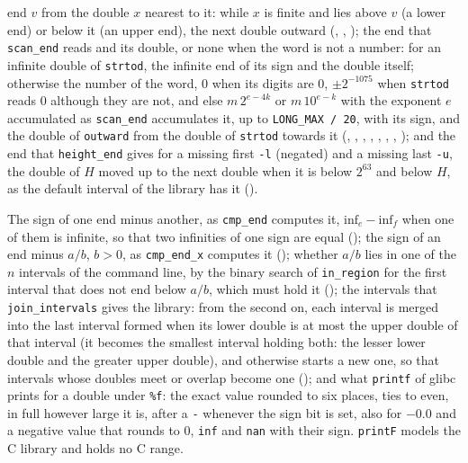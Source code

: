 \begin{definition}
  end $v$ from the double $x$ nearest to it: while $x$ is finite and lies above $v$ (a lower end) or
  below it (an upper end), the next double outward (,
  , ); the end that \verb|scan_end| reads and
  its double, or none when the word is not a number: for an infinite double of \verb|strtod|, the
  infinite end of its sign and the double itself; otherwise the number of the word, $0$ when its
  digits are $0$, $\pm 2^{-1075}$ when \verb|strtod| reads $0$ although they are not, and else
  $m\,2^{e - 4k}$ or $m\,10^{e - k}$ with the exponent $e$ accumulated as \verb|scan_end|
  accumulates it, up to \verb|LONG_MAX / 20|, with its sign, and the double of \verb|outward| from
  the double of \verb|strtod| towards it (, ,
  , , ,
  , , ); and the end
  that \verb|height_end| gives for a missing first \verb|-l| (negated) and a missing last \verb|-u|,
  the double of $H$ moved up to the next double when it is below $2^{63}$ and below $H$, as the
  default interval of the library has it ().
\end{definition}

\begin{definition}\label{def:cliRegionTest}
  \leanok
  The sign of one end minus another, as \verb|cmp_end| computes it,
  $\mathrm{inf}_e - \mathrm{inf}_f$ when one of them is infinite, so that two infinities of one sign
  are equal (); the sign of an end minus $a/b$, $b > 0$, as
  \verb|cmp_end_x| computes it (); whether $a/b$ lies in one of the $n$
  intervals of the command line, by the binary search of \verb|in_region| for the first interval
  that does not end below $a/b$, which must hold it (); the intervals that
  \verb|join_intervals| gives the library: from the second on, each interval is merged into the last
  interval formed when its lower double is at most the upper double of that interval (it becomes the
  smallest interval holding both: the lesser lower double and the greater upper double), and
  otherwise starts a new one, so that intervals whose doubles meet or overlap become one
  (); and what \verb|printf| of glibc prints for a double under \verb|%f|:
  the exact value rounded to six places, ties to even, in full however large it is, after a \verb|-|
  whenever the sign bit is set, also for $-0.0$ and a negative value that rounds to $0$, \verb|inf|
  and \verb|nan| with their sign. \verb|printF| models the C library and holds no C range.
\end{definition}

